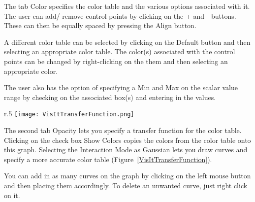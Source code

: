 \begin{figure}[h]
  \centering
  \vspace{-10pt}
  \hspace{10pt}
  \hspace{10pt}
  \caption{}
  \vspace{-10pt}
  \label{}
\end{figure}

The tab Color specifies the color table and the various options
associated with it. The user can add/ remove control points by
clicking on the + and - buttons. These can then be equally spaced by
pressing the Align button.

A different color table can be selected by clicking on the Default
button and then selecting an appropriate color table. The color(s)
associated with the control points can be changed by right-clicking on
the them and then selecting an appropriate color.

The user also has the option of specifying a Min and Max on the scalar
value range by checking on the associated box(s) and entering in the
values.

\begin{wrapfigure}{r}{.5\textwidth}
  \center
  \vspace{-20pt}
  \texttt{[image: VisItTransferFunction.png]}
  \caption{The opacity transfer function in the attributes window}
  \label{VisItTransferFunction}
\end{wrapfigure}

The second tab Opacity lets you specify a transfer function for the
color table. Clicking on the check box Show Colors copies the colors
from the color table onto this graph. Selecting the Interaction Mode
as Gaussian lets you draw curves and specify a more accurate color
table (Figure~\ref{VisItTransferFunction}).

You can add in as many curves on the graph by clicking on the left
mouse button and then placing them accordingly. To delete an unwanted
curve, just right click on it.


